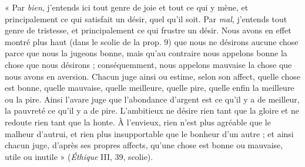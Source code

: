« Par {\it bien}, j'entends ici tout genre de joie et tout ce qui y mène, et principalement
ce qui satisfait un désir, quel qu’il soit. Par {\it mal}, j'entends tout genre de tristesse, et
principalement ce qui frustre un désir. Nous avons en effet montré plus haut (dans le
scolie de la prop. 9) que nous ne désirons aucune chose parce que nous la jugeons
bonne, mais qu’au contraire nous appelons bonne la chose que nous désirons ; conséquemment,
nous appelons mauvaise la chose que nous avons en aversion. Chacun juge
ainsi ou estime, selon son affect, quelle chose est bonne, quelle mauvaise, quelle
meilleure, quelle pire, quelle enfin la meilleure ou la pire. Ainsi l’avare juge que l’abondance
d’argent est ce qu’il y a de meilleur, la pauvreté ce qu’il y a de pire. L’ambitieux
ne désire rien tant que la gloire et ne redoute rien tant que la honte. À l’envieux, rien
n'est plus agréable que le malheur d'autrui, et rien plus insupportable que le bonheur
d’un autre ; et ainsi chacun juge, d’après ses propres affects, qu’une chose est bonne ou
mauvaise, utile ou inutile » ({\it Éthique} III, 39, scolie).

